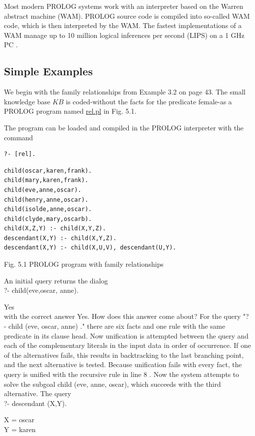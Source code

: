 \documentclass[10pt]{book}
\begin{document}
Most modern PROLOG systems work with an interpreter based on the Warren abstract machine (WAM). PROLOG source code is compiled into so-called WAM code, which is then interpreted by the WAM. The fastest implementations of a WAM manage up to 10 million logical inferences per second (LIPS) on a 1 GHz PC .

\subsection{Simple Examples}
We begin with the family relationships from Example 3.2 on page 43. The small knowledge base $K B$ is coded-without the facts for the predicate female-as a PROLOG program named \href{http://rel.pl}{rel.pl} in Fig. 5.1.

The program can be loaded and compiled in the PROLOG interpreter with the command

\begin{verbatim}
?- [rel].
\end{verbatim}

\begin{verbatim}
child(oscar,karen,frank).
child(mary,karen,frank).
child(eve,anne,oscar).
child(henry,anne,oscar).
child(isolde,anne,oscar).
child(clyde,mary,oscarb).
child(X,Z,Y) :- child(X,Y,Z).
descendant(X,Y) :- child(X,Y,Z).
descendant(X,Y) :- child(X,U,V), descendant(U,Y).
\end{verbatim}

Fig. 5.1 PROLOG program with family relationships

An initial query returns the dialog\\
?- child(eve,oscar, anne).

Yes\\
with the correct answer Yes. How does this answer come about? For the query "? - child (eve, oscar, anne) ." there are six facts and one rule with the same predicate in its clause head. Now unification is attempted between the query and each of the complementary literals in the input data in order of occurrence. If one of the alternatives fails, this results in backtracking to the last branching point, and the next alternative is tested. Because unification fails with every fact, the query is unified with the recursive rule in line 8 . Now the system attempts to solve the subgoal child (eve, anne, oscar), which succeeds with the third alternative. The query\\
?- descendant (X,Y).

X = oscar\\
Y = karen
\end{document}
